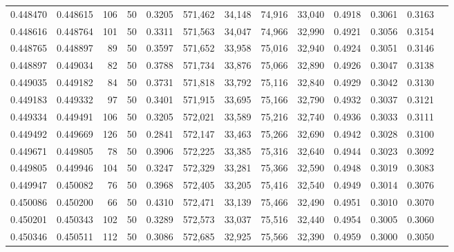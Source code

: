 \begin{tabular}{rrrrrrrrrrrrr}
0.448470 & 0.448615 &   106 &  50 &                                     0.3205 & 571,462 &  34,148 &  74,916 &  33,040 & 0.4918 & 0.3061 & 0.3163 \\
0.448616 & 0.448764 &   101 &  50 &                                     0.3311 & 571,563 &  34,047 &  74,966 &  32,990 & 0.4921 & 0.3056 & 0.3154 \\
0.448765 & 0.448897 &    89 &  50 &                                     0.3597 & 571,652 &  33,958 &  75,016 &  32,940 & 0.4924 & 0.3051 & 0.3146 \\
0.448897 & 0.449034 &    82 &  50 &                                     0.3788 & 571,734 &  33,876 &  75,066 &  32,890 & 0.4926 & 0.3047 & 0.3138 \\
0.449035 & 0.449182 &    84 &  50 &                                     0.3731 & 571,818 &  33,792 &  75,116 &  32,840 & 0.4929 & 0.3042 & 0.3130 \\
0.449183 & 0.449332 &    97 &  50 &                                     0.3401 & 571,915 &  33,695 &  75,166 &  32,790 & 0.4932 & 0.3037 & 0.3121 \\
0.449334 & 0.449491 &   106 &  50 &                                     0.3205 & 572,021 &  33,589 &  75,216 &  32,740 & 0.4936 & 0.3033 & 0.3111 \\
0.449492 & 0.449669 &   126 &  50 &                                     0.2841 & 572,147 &  33,463 &  75,266 &  32,690 & 0.4942 & 0.3028 & 0.3100 \\
0.449671 & 0.449805 &    78 &  50 &                                     0.3906 & 572,225 &  33,385 &  75,316 &  32,640 & 0.4944 & 0.3023 & 0.3092 \\
0.449805 & 0.449946 &   104 &  50 &                                     0.3247 & 572,329 &  33,281 &  75,366 &  32,590 & 0.4948 & 0.3019 & 0.3083 \\
0.449947 & 0.450082 &    76 &  50 &                                     0.3968 & 572,405 &  33,205 &  75,416 &  32,540 & 0.4949 & 0.3014 & 0.3076 \\
0.450086 & 0.450200 &    66 &  50 &                                     0.4310 & 572,471 &  33,139 &  75,466 &  32,490 & 0.4951 & 0.3010 & 0.3070 \\
0.450201 & 0.450343 &   102 &  50 &                                     0.3289 & 572,573 &  33,037 &  75,516 &  32,440 & 0.4954 & 0.3005 & 0.3060 \\
0.450346 & 0.450511 &   112 &  50 &                                     0.3086 & 572,685 &  32,925 &  75,566 &  32,390 & 0.4959 & 0.3000 & 0.3050 \\

\end{tabular}
